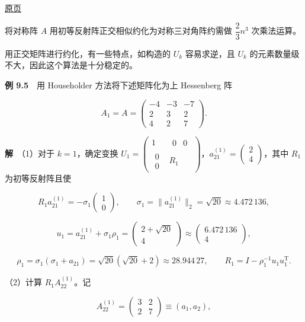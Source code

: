 \documentclass[
  10pt,
  fontset=fandol]{ctexart}
\begin{document}
\href{../../source-images/pdf-249.jpeg}{原页}

将对称阵 \(A\) 用初等反射阵正交相似约化为对称三对角阵约需做 \(\dfrac23n^3\) 次乘法运算。

用正交矩阵进行约化，有一些特点，如构造的 \(U_k\) 容易求逆，且 \(U_k\) 的元素数量级不大，因此这个算法是十分稳定的。

\textbf{例 9.5}　用 Householder 方法将下述矩阵化为上 Hessenberg 阵

\[
A_1=A=\begin{pmatrix}-4&-3&-7\\2&3&2\\4&2&7\end{pmatrix}.
\]

\textbf{解}　（1）对于 \(k=1\)，确定变换 \(U_1=\begin{pmatrix}1&\begin{matrix}0&0\end{matrix}\\\begin{matrix}0\\0\end{matrix}&R_1\end{pmatrix}\)，\(a_{21}^{(1)}=\begin{pmatrix}2\\4\end{pmatrix}\)，其中 \(R_1\) 为初等反射阵且使

\[
R_1a_{21}^{(1)}=-\sigma_1\begin{pmatrix}1\\0\end{pmatrix},\qquad
\sigma_1=\|a_{21}^{(1)}\|_2=\sqrt{20}\approx4.472\,136,
\]

\[
u_1=a_{21}^{(1)}+\sigma_1\rho_1=\begin{pmatrix}2+\sqrt{20}\\4\end{pmatrix}
\approx\begin{pmatrix}6.472\,136\\4\end{pmatrix},
\]

\[
\rho_1=\sigma_1(\sigma_1+a_{21})=\sqrt{20}(\sqrt{20}+2)\approx28.944\,27,\qquad
R_1=I-\rho_1^{-1}u_1u_1^{\mathrm T}.
\]

（2）计算 \(R_1A_{22}^{(1)}\)。记

\[
A_{22}^{(1)}=\begin{pmatrix}3&2\\2&7\end{pmatrix}\equiv(a_1,a_2),
\]
\end{document}
